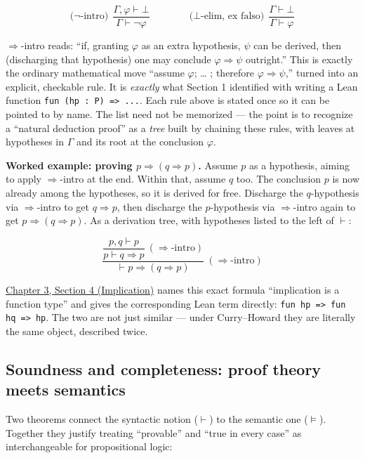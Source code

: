 \[
\text{($\neg$-intro)}\ \ \frac{\Gamma, \varphi \vdash \bot}{\Gamma \vdash \neg\varphi}
\qquad\qquad
\text{($\bot$-elim, ex falso)}\ \ \frac{\Gamma \vdash \bot}{\Gamma \vdash \varphi}
\]

\(\Rightarrow\)-intro reads: ``if, granting \(\varphi\) as an extra hypothesis, \(\psi\) can be derived, then (discharging that hypothesis) one may conclude \(\varphi \Rightarrow \psi\) outright.'' This is exactly the ordinary mathematical move ``assume \(\varphi\); \ldots{} ; therefore \(\varphi
\Rightarrow \psi\),'' turned into an explicit, checkable rule. It is \emph{exactly} what Section 1 identified with writing a Lean function \texttt{fun (hp : P) => ...}. Each rule above is stated once so it can be pointed to by name. The list need not be memorized --- the point is to recognize a ``natural deduction proof'' as a \emph{tree} built by chaining these rules, with leaves at hypotheses in \(\Gamma\) and its root at the conclusion \(\varphi\).

\textbf{Worked example: proving \(p \Rightarrow (q \Rightarrow p)\).} Assume \(p\) as a hypothesis, aiming to apply \(\Rightarrow\)-intro at the end. Within that, assume \(q\) too. The conclusion \(p\) is now already among the hypotheses, so it is derived for free. Discharge the \(q\)-hypothesis via \(\Rightarrow\)-intro to get \(q \Rightarrow p\), then discharge the \(p\)-hypothesis via \(\Rightarrow\)-intro again to get \(p \Rightarrow (q \Rightarrow p)\). As a derivation tree, with hypotheses listed to the left of \(\vdash\):

\[
\dfrac{\dfrac{p, q \vdash p}{p \vdash q \Rightarrow p}\ (\Rightarrow\text{-intro})}
{\vdash p \Rightarrow (q \Rightarrow p)}\ (\Rightarrow\text{-intro})
\]

\hyperref[sec:03-propositions-and-proofs:04-implication:1]{Chapter 3, Section 4 (Implication)} names this exact formula ``implication is a function type'' and gives the corresponding Lean term directly: \texttt{fun hp => fun hq => hp}. The two are not just similar --- under Curry--Howard they are literally the same object, described twice.

\subsection{Soundness and completeness: proof theory meets semantics}\label{sec:03-propositions-and-proofs:02-logic-recap:6}

Two theorems connect the syntactic notion (\(\vdash\)) to the semantic one (\(\models\)). Together they justify treating ``provable'' and ``true in every case'' as interchangeable for propositional logic:

